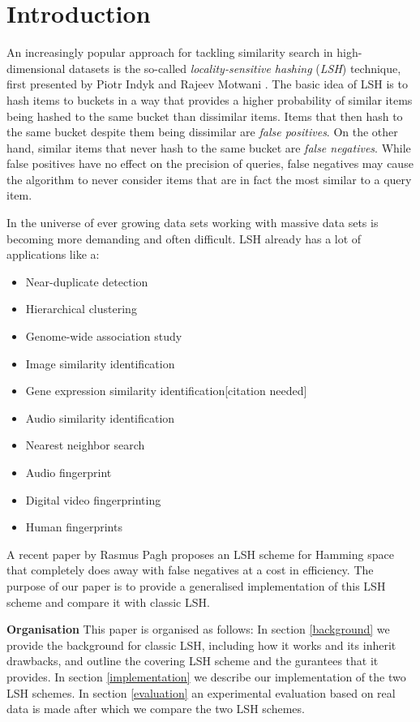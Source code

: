 \section{Introduction}
\label{introduction}

An increasingly popular approach for tackling similarity search in high-dimensional datasets is the so-called \textit{locality-sensitive hashing} (\textit{LSH}) technique, first presented by Piotr Indyk and Rajeev Motwani \cite{DBLP:conf/stoc/IndykM98}. The basic idea of LSH is to hash items to buckets in a way that provides a higher probability of similar items being hashed to the same bucket than dissimilar items. Items that then hash to the same bucket despite them being dissimilar are \textit{false positives}. On the other hand, similar items that never hash to the same bucket are \textit{false negatives}. While false positives have no effect on the precision of queries, false negatives may cause the algorithm to never consider items that are in fact the most similar to a query item.

In the universe of ever growing data sets working with massive data sets is becoming more demanding and often difficult. LSH already has a lot of applications like a:

\begin{itemize}
  \item Near-duplicate detection
  \item Hierarchical clustering
  \item Genome-wide association study
  \item Image similarity identification
  \item Gene expression similarity identification[citation needed]
  \item Audio similarity identification
  \item Nearest neighbor search
  \item Audio fingerprint
  \item Digital video fingerprinting
  \item Human fingerprints 
\end{itemize}

A recent paper by Rasmus Pagh \cite{DBLP:journals/corr/Pagh15} proposes an LSH scheme for Hamming space that completely does away with false negatives at a cost in efficiency. The purpose of our paper is to provide a generalised implementation of this LSH scheme and compare it with classic LSH.

\textbf{Organisation} This paper is organised as follows: In section \ref{background} we provide the background for classic LSH, including how it works and its inherit drawbacks, and outline the covering LSH scheme and the gurantees that it provides. In section \ref{implementation} we describe our implementation of the two LSH schemes. In section \ref{evaluation} an experimental evaluation based on real data is made after which we compare the two LSH schemes.
